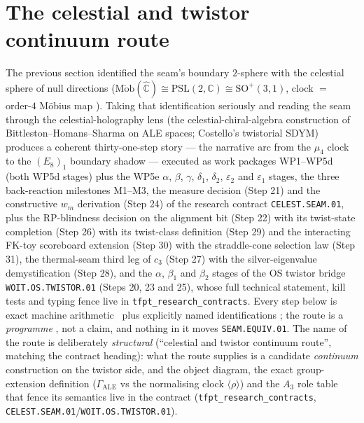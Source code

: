 \documentclass[11pt,a4paper]{article}
\theoremstyle{definition}
\begin{document}
\section{The celestial and twistor continuum route}\label{sec:celestial}
The previous section identified the seam's boundary $2$-sphere with the celestial sphere of null
directions ($\mathrm{M\ddot{o}b}(\hat{\mathbb C})\cong\mathrm{PSL}(2,\mathbb C)\cong\mathrm{SO}^+(3,1)$,
clock $=$ order-$4$ M\"obius map ). Taking that identification seriously
and reading the seam through the celestial-holography lens (the celestial-chiral-algebra construction of
Bittleston--Homans--Sharma on ALE spaces; Costello's twistorial SDYM) produces a coherent
thirty-one-step
story --- the narrative arc from the $\mu_4$ clock to the $(E_8)_1$ boundary shadow --- executed as
work packages WP1--WP5d (both WP5d stages) plus the WP5e $\alpha$, $\beta$,
$\gamma$, $\delta_1$, $\delta_2$, $\varepsilon_2$ and $\varepsilon_1$ stages, the three back-reaction
milestones M1--M3, the measure decision (Step 21) and the constructive $w_m$ derivation
(Step 24) of the research contract
\texttt{CELEST.SEAM.01}, plus the RP-blindness decision on the alignment bit (Step 22) with its
twist-state completion (Step 26) with its twist-class definition (Step 29)
and the interacting FK-toy scoreboard extension (Step 30) with the straddle-cone
selection law (Step 31), the thermal-seam
third leg of $c_3$ (Step 27) with the silver-eigenvalue demystification (Step 28), and the
$\alpha$, $\beta_1$ and $\beta_2$ stages of the OS twistor bridge
\texttt{WOIT.OS.TWISTOR.01} (Steps 20, 23 and 25), whose
full technical statement, kill tests and typing fence live in \texttt{tfpt\_research\_contracts}. Every
step below is exact machine arithmetic \mE\ plus explicitly named identifications \mC; the route is a
\emph{programme} \mO, not a claim, and nothing in it moves \texttt{SEAM.EQUIV.01}. The name of the
route is deliberately \emph{structural} (``celestial and twistor continuum route'', matching the
contract heading): what the route supplies is a candidate \emph{continuum} construction on the twistor
side, and the object diagram, the exact group-extension definition ($\Gamma_{\mathrm{ALE}}$ vs the
normalising clock $\langle\rho\rangle$) and the $A_3$ role table that fence its semantics live in the
contract (\texttt{tfpt\_research\_contracts}, \texttt{CELEST.SEAM.01}/\texttt{WOIT.OS.TWISTOR.01}).
\end{document}
